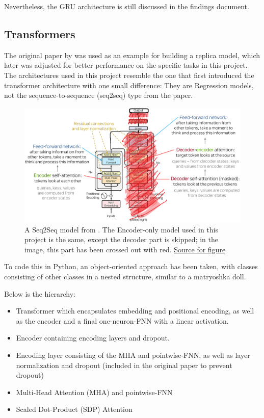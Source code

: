 \documentclass{article}
\begin{document}
Nevertheless, the GRU architecture is still discussed in the findings document.

\newpage
\subsection{Transformers}

The original paper by \cite{vaswani2023attentionneed} was used as an example for building a replica model, which later was adjusted for better performance on the specific tasks in this project. The architectures used in this project resemble the one that first introduced the transformer architecture with one small difference: They are Regression models, not the sequence-to-sequence (seq2seq) type from the paper.



\begin{figure}[htbp]
    \centering
    \includegraphics[width=0.5\paperwidth]{images/transformerSeq2Seq.png}
    \caption{A Seq2Seq model from \cite{vaswani2023attentionneed}. The 
    Encoder-only model used in this project is the same, except the decoder 
    part is skipped; in the image, this part has been crossed out with red. \href{https://www.cloud.studio/ai-llm-how-do-llms-work}{Source for figure}}
    \label{fig:transformerSeq2Seq}
\end{figure}

To code this in Python, an object-oriented approach has been taken, with classes consisting of other classes in a nested structure, similar to a matryoshka doll.

Below is the hierarchy:

\begin{itemize}
    \item Transformer which encapsulates embedding and positional encoding, as well as the encoder and a final one-neuron-FNN with a linear activation.
    \item Encoder containing encoding layers and dropout.
    \item Encoding layer consisting of the MHA and pointwise-FNN, as well as layer normalization and dropout (included in the original paper to prevent dropout)
    \item Multi-Head Attention (MHA) and pointwise-FNN
    \item Scaled Dot-Product (SDP) Attention
\end{itemize}
\end{document}
